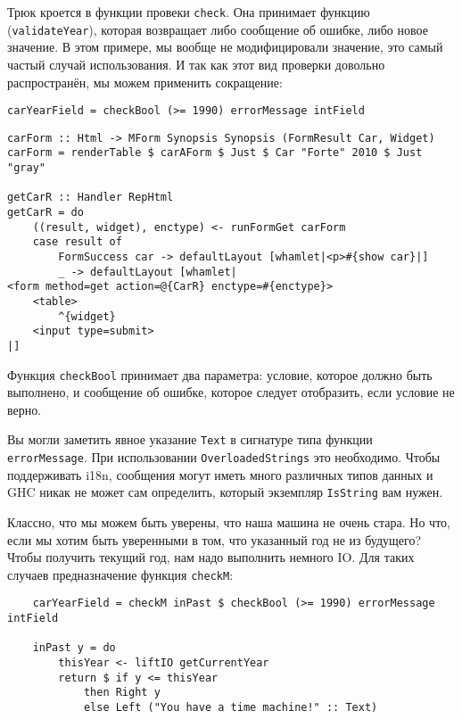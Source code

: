 Трюк кроется в функции провеки \lstinline'check'. Она принимает функцию 
(\lstinline'validateYear'), которая возвращает либо сообщение об ошибке, либо новое
значение. В этом примере, мы вообще не модифицировали значение, это самый частый случай
использования. И так как этот вид проверки довольно распространён, мы можем применить
сокращение:

\begin{lstlisting}
carYearField = checkBool (>= 1990) errorMessage intField
\end{lstlisting}

\begin{lstlisting}
carForm :: Html -> MForm Synopsis Synopsis (FormResult Car, Widget)
carForm = renderTable $ carAForm $ Just $ Car "Forte" 2010 $ Just "gray"

getCarR :: Handler RepHtml
getCarR = do
    ((result, widget), enctype) <- runFormGet carForm
    case result of
        FormSuccess car -> defaultLayout [whamlet|<p>#{show car}|]
        _ -> defaultLayout [whamlet|
<form method=get action=@{CarR} enctype=#{enctype}>
    <table>
        ^{widget}
    <input type=submit>
|]
\end{lstlisting}

Функция \lstinline'checkBool' принимает два параметра: условие, которое должно быть
выполнено, и сообщение об ошибке, которое следует отобразить, если условие не верно.

\begin{remark}
Вы могли заметить явное указание \lstinline'Text' в сигнатуре типа функции
\lstinline'errorMessage'. При использовании \lstinline'OverloadedStrings' это
необходимо. Чтобы поддерживать i18n, сообщения могут иметь много различных типов
данных и GHC никак не может сам определить, который экземпляр \lstinline'IsString' вам
нужен.
\end{remark}

Классно, что мы можем быть уверены, что наша машина не очень стара. Но что, если мы хотим
быть уверенными в том, что указанный год не из будущего? Чтобы получить текущий год, нам
надо выполнить немного IO. Для таких случаев предназначение функция \lstinline'checkM':

\begin{lstlisting}
    carYearField = checkM inPast $ checkBool (>= 1990) errorMessage intField

    inPast y = do
        thisYear <- liftIO getCurrentYear
        return $ if y <= thisYear
            then Right y
            else Left ("You have a time machine!" :: Text)
\end{lstlisting}

